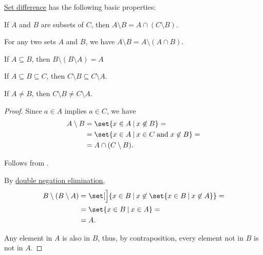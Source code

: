 \begin{proposition}\label{thm:set_difference}
  \hyperref[def:basic_set_operations/difference]{Set difference} has the following basic properties:
  \begin{thmenum}
     If \( A \) and \( B \) are subsets of \( C \), then \( A \setminus B = A \cap (C \setminus B) \).

     For any two sets \( A \) and \( B \), we have \( A \setminus B = A \setminus (A \cap B) \).

     If \( A \subseteq B \), then \( B \setminus (B \setminus A) = A \)

     If \( A \subseteq B \subseteq C \), then \( C \setminus B \subseteq C \setminus A \).

    If \( A \neq B \), then \( C \setminus B \neq C \setminus A \).
  \end{thmenum}
\end{proposition}
\begin{proof}
   Since \( a \in A \) implies \( a \in C \), we have
  \begin{align*}
    A \setminus B
    &=
    \set{ x \in A \given x \not\in B }
    = \\ &=
    \set{ x \in A \given x \in C \T{and} x \not\in B }
    = \\ &=
    A \cap (C \setminus B).
  \end{align*}

   Follows from .

   By \hyperref[thm:classical_tautologies/dne]{double negation elimination},
  \begin{align*}
    B \setminus (B \setminus A)
    &=
    \set[\Big]{ x \in B \given x \not\in \set{ x \in B \given x \not\in A } }
    = \\ &=
    \set{ x \in B \given x \in A }
    = \\ &=
    A.
  \end{align*}

   Any element in \( A \) is also in \( B \), thus, by contraposition, every element not in \( B \) is not in \( A \).
\end{proof}


